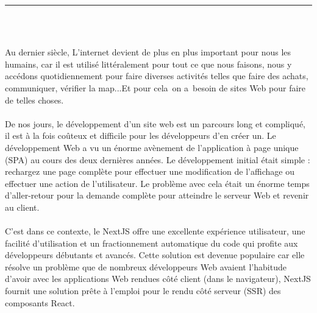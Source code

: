 \documentclass[12pt]{report}
\begin{document}
\listoftables



\newpage

\pagestyle{myfancy}

\vspace*{-0.2in}

\setcounter{page}{1}

\begin{center}
    {\color{Blue} \rule{6.2in}{1.4mm} }\\
    \vspace{0.1in}
    \scshape{\fontsize{34}{46}{\bfseries{\color{Blue}{Introduction générale}}}}
    \\
    \vspace{0.5in}
\end{center}
\hspace*{0.16in}
Au dernier siècle, L'internet devient de plus en plus important pour nous les humains, car il est utilisé littéralement pour tout ce que nous faisons, nous y accédons quotidiennement pour faire diverses activités telles que faire des achats, communiquer, vérifier la map...Et pour cela on a besoin de sites Web pour faire de telles choses.
\\\\
\hspace*{0.16in}
De nos jours, le développement d'un site web est un parcours long et compliqué, il est à la fois coûteux et difficile pour les développeurs d'en créer un. Le développement Web a vu un énorme avènement de l’application à page unique (SPA) au cours des deux dernières années. Le développement initial était simple : rechargez une page complète pour effectuer une modification de l’affichage ou effectuer une action de l’utilisateur. Le problème avec cela était un énorme temps d’aller-retour pour la demande complète pour atteindre le serveur Web et revenir au client.
\\\\
\hspace*{0.16in}
C’est dans ce contexte, le NextJS offre une excellente expérience utilisateur, une facilité d’utilisation et un fractionnement automatique du code qui profite aux développeurs débutants et avancés. Cette solution est devenue populaire car elle résolve un problème que de nombreux développeurs Web avaient l’habitude d’avoir avec les applications Web rendues côté client (dans le navigateur), NextJS fournit une solution prête à l’emploi pour le rendu côté serveur (SSR) des composants React.
\end{document}
